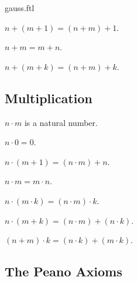 \documentclass[english]{article}
\begin{document}
\begin{smodule}{gauss.ftl}
\begin{forthel}
  \begin{axiom}[title=Addition Axiom II]
    $n + (m + 1) = (n + m) + 1$.
  \end{axiom}

  \begin{axiom}[title=Commutativity of Addition]
    $n + m = m + n$.
  \end{axiom}

  \begin{axiom}[title=Associativity of Addition]
    $n + (m + k) = (n + m) + k$.
  \end{axiom}
\end{forthel}


\subsection{Multiplication}

\begin{forthel}
  \begin{signature}
    $n \cdot m$ is a natural number.
  \end{signature}

  \begin{axiom}
    $n \cdot 0 = 0$.
  \end{axiom}

  \begin{axiom}
    $n \cdot (m + 1) = (n \cdot m) + n$.
  \end{axiom}

  \begin{axiom}[title=Commutativity of Multiplication]
    $n \cdot m = m \cdot n$.
  \end{axiom}

  \begin{axiom}[title=Associativity of Multiplication]
    $n \cdot (m \cdot k) = (n \cdot m) \cdot k$.
  \end{axiom}

  \begin{axiom}[title=Left Distributivity]
    $n \cdot (m + k) = (n \cdot m) + (n \cdot k)$.
  \end{axiom}

  \begin{axiom}[title=Right Distributivity]
    $(n + m) \cdot k = (n \cdot k) + (m \cdot k)$.
  \end{axiom}
\end{forthel}


\subsection{The Peano Axioms}


\end{smodule}
\end{document}
